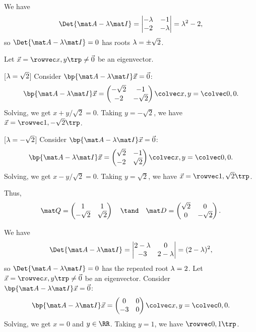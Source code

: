 \begin{solution}
    \begin{ppart}
        We have \[\Det{\mat A - \l \mat I} = \begin{vmatrix}-\l & -1 \\ -2 & -\l\end{vmatrix} = \l^2 - 2,\] so $\Det{\mat A - \l \mat I} = 0$ has roots $\lambda = \pm \sqrt2$.

        Let $\vec x = \cveciix{x}{y} \neq \vec 0$ be an eigenvector.

        [$\lambda = \sqrt2$] Consider $\bp{\mat A - \l \mat I} \vec x = \vec 0$: \[\bp{\mat A - \l \mat I} \vec x = \begin{pmatrix}-\sqrt2 & -1 \\ -2 & -\sqrt2\end{pmatrix} \cvecii{x}{y} = \cvecii00.\] Solving, we get $x + y/\sqrt{2} = 0$. Taking $y = -\sqrt2$, we have $\vec x = \cveciix{1}{-\sqrt2}$.

        [$\lambda = -\sqrt2$] Consider $\bp{\mat A - \l \mat I} \vec x = \vec 0$: \[\bp{\mat A - \l \mat I} \vec x = \begin{pmatrix}\sqrt2 & -1 \\ -2 & \sqrt2\end{pmatrix} \cvecii{x}{y} = \cvecii00.\] Solving, we get $x - y/\sqrt{2} = 0$. Taking $y = \sqrt2$, we have $\vec x = \cveciix1{\sqrt2}$.

        Thus, \[\mat Q = \begin{pmatrix}1 & 1 \\ -\sqrt2 & \sqrt2 \end{pmatrix} \quad \tand \quad \mat D = \begin{pmatrix}\sqrt2 & 0 \\ 0 & -\sqrt2 \end{pmatrix}.\]
    \end{ppart}
    \begin{ppart}
        We have \[\Det{\mat A - \l \mat I} = \begin{vmatrix}2-\l & 0 \\ -3 & 2-\l\end{vmatrix} = (2-\l)^2,\] so $\Det{\mat A - \l \mat I} = 0$ has the repeated root $\lambda = 2$. Let $\vec x = \cveciix{x}{y} \neq \vec 0$ be an eigenvector. Consider $\bp{\mat A - \l \mat I} \vec x = \vec 0$: \[\bp{\mat A - \l \mat I} \vec x = \begin{pmatrix}0 & 0 \\ -3 & 0 \end{pmatrix} \cvecii{x}{y} = \cvecii00.\] Solving, we get $x = 0$ and $y \in \RR$. Taking $y = 1$, we have $\cveciix01$.


\end{ppart}
\end{solution}
